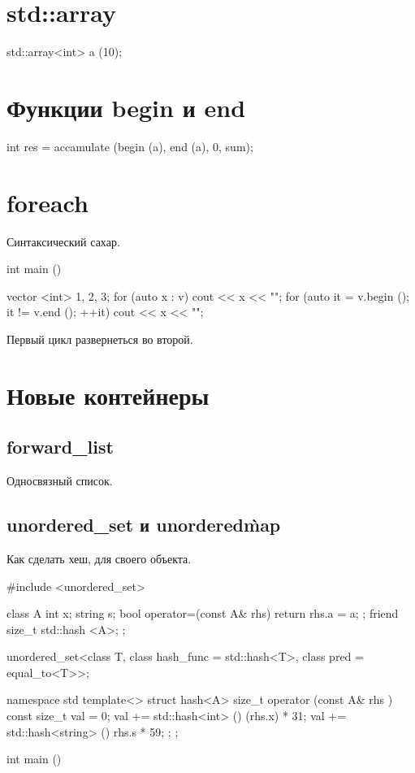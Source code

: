 \section{std::array}
\begin{cppcode}
std::array<int> a (10);
\end{cppcode}

\section{Функции begin и end}
\begin{cppcode}
int res = accamulate (begin (a), end (a), 0, sum);
\end{cppcode}

\section{foreach}
Синтаксический сахар.

\begin{cppcode}
int main () {
  vector <int> {1, 2, 3};
  for (auto x : v) {
    cout << x << "\n";
  }
  for (auto it = v.begin (); it != v.end (); ++it) {
   cout << x << "\n"; 
  }

}
\end{cppcode}

Первый цикл развернеться во второй.

\section{Новые контейнеры}

\subsection{forward\_list}
Односвязный список.

\subsection{unordered\_set и unordered\`map}
Как сделать хеш, для своего объекта. 
\begin{cppcode}

#include <unordered_set>

class A {
  int x;
  string s;
  bool operator=(const A& rhs) {
    return rhs.a = a;
  };
  friend size_t std::hash <A>;
};

unordered_set<class T, class hash_func = std::hash<T>, class pred = equal_to<T>>;

namespace std {
  template<>
  struct hash<A> {
    size_t operator (const A& rhs ) const {
      size_t val = 0;
      val += std::hash<int> () (rhs.x) * 31;
      val += std::hash<string> () rhs.s * 59;
    }
  };
};

int main () {


}
\end{cppcode}
          





